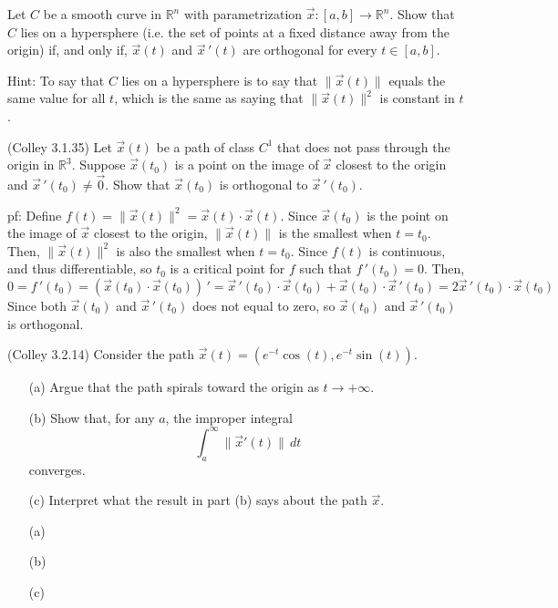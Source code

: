 \documentclass[11pt,letterpaper,cm]{nupset}
\begin{document}
\begin{problem}[Exercise 5] Let $C$ be a smooth curve in $\mathbb{R}^n$ with parametrization $\vec{x}: [a,b] \to \mathbb{R}^n$. Show that $C$ lies on a hypersphere (i.e. the set of points at a fixed distance away from the origin) if, and only if, $\vec{x}(t)$ and $\vec{x}\,'(t)$ are orthogonal for every $t \in [a,b]$. 
	\medskip
	
	Hint: To say that $C$ lies on a hypersphere is to say that $\|\vec{x}(t)\|$ equals the same value for all $t$, which is the same as saying that $\|\vec{x}(t)\|^2$ is constant in $t$.
\end{problem}
\begin{solution}
\end{solution}
\newpage

\begin{problem}[Exercise 6] (Colley 3.1.35) Let $\vec{x}(t)$ be a path of class $C^1$ that does not pass through the origin in $\mathbb{R}^3$. Suppose $\vec{x}(t_0)$ is a point on the image of $\vec{x}$ closest to the origin and $\vec{x}\,'(t_0) \ne \vec{0}$. Show that $\vec{x}(t_0)$ is orthogonal to $\vec{x}\,'(t_0)$.
\end{problem}
\begin{solution}
	pf: Define $f(t)=\|\vec{x}(t)\|^2=\vec{x}(t)\cdot\vec{x}(t)$. Since $\vec{x}(t_0)$ is the point on the image of $\vec{x}$ closest to the origin, $\|\vec{x}(t)\|$ is the smallest when $t=t_0$. Then, $\|\vec{x}(t)\|^2$ is also the smallest when $t=t_0$. Since $f(t)$ is continuous, and thus differentiable, so $t_0$ is a critical point for $f$ such that $f\,'(t_0)=0$. Then,
	$$0=f\,'(t_0)=(\vec{x}(t_0)\cdot\vec{x}(t_0))\,'=\vec{x}\,'(t_0)\cdot\vec{x}(t_0)+\vec{x}(t_0)\cdot\vec{x}\,'(t_0)=2\vec{x}\,'(t_0)\cdot\vec{x}(t_0)$$
	Since both $\vec{x}(t_0)$ and $\vec{x}\,'(t_0)$ does not equal to zero, so $\vec{x}(t_0)$ and $\vec{x}\,'(t_0)$ is orthogonal. 
\end{solution}
\newpage

\begin{problem}[Exercise 7] (Colley 3.2.14) Consider the path $\vec{x}(t)=(e^{-t}\cos (t),e^{-t}\sin (t))$.
	\begin{itemize}
		\item[(a)] Argue that the path spirals toward the origin as $t \to +\infty$.
		\item[(b)] Show that, for any $a$, the improper integral
		\[ \int_a^\infty \|\vec{x}'(t)\|\,dt \]
		converges.
		\item[(c)] Interpret what the result in part (b) says about the path $\vec{x}$.
	\end{itemize}
\end{problem}
\begin{solution}
	\begin{itemize}
		\item[(a)]
		\item[(b)]
		\item[(c)]
	\end{itemize}
\end{solution}
\newpage
\end{document}
